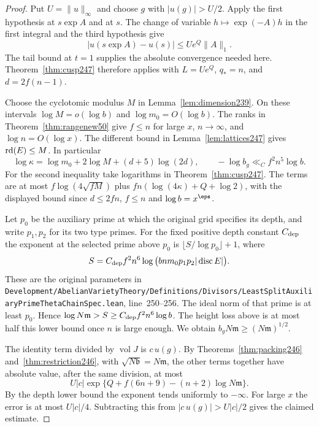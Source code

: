 \documentclass[a4paper,11pt]{article}
\theoremstyle{definition}
\theoremstyle{remark}
\newcommand{\srcloc}[2]{{\small\nolinkurl{#1.lean}}, line~#2}
\numberwithin{equation}{section}
\begin{document}
\begin{proof}
Put \(U=\|u\|_\infty\) and choose \(g\) with \(|u(g)|>U/2\).
Apply the first hypothesis at \(s\exp A\) and at \(s\). The change
of variable \(h\mapsto\exp(-A)h\) in the first integral and the third
hypothesis give
\[
                |u(s\exp A)-u(s)|\le U e^Q\|A\|_1 .
\]
The tail bound at \(t=1\) supplies the absolute convergence needed
here. Theorem~\ref{thm:cusp247} therefore applies with \(L=Ue^Q\),
\(q_*=n\), and \(d=2f(n-1)\).

Choose the cyclotomic modulus \(M\) in Lemma~\ref{lem:dimension239}.
On these intervals \(\log M=o(\log b)\) and \(\log m_0=O(\log b)\).
The ranks in Theorem~\ref{thm:rangenew50} give \(f\le n\) for large
\(x\), \(n\to\infty\), and \(\log n=O(\log x)\). The different
bound in Lemma~\ref{lem:lattices247} gives \({\rm rd}(E)\le M\).
In particular
\[
 \log\kappa=\log m_0+2\log M+(d+5)\log(2d),\qquad
               -\log b_g\ll_C f^2 n^5\log b .
\]
For the second inequality take logarithms in Theorem~\ref{thm:cusp247}.
The terms are at most \(f\log(4\sqrt{fM})\) plus
\(fn(\log(4\kappa)+Q+\log 2)\), with the displayed bound since
\(d\le2fn\), \(f\le n\) and \(\log b=x^\eps\).

Let \(p_0\) be the auxiliary prime at which the original grid
specifies its depth, and write \(p_1,p_2\) for its two type primes.
For the fixed positive depth constant \(C_{\rm dep}\) the exponent
at the selected prime above \(p_0\) is \(\lfloor S/\log p_0\rfloor+1\),
where
\[
    S=C_{\rm dep} f^2 n^6
         \log\big(b n m_0 p_1p_2 |\operatorname{disc}E|\big).
\]
These are the original parameters in
\srcloc{Development/AbelianVarietyTheory/Definitions/Divisors/LeastSplitAuxiliaryPrimeThetaChainSpec}{250--256}.
The ideal norm of that prime is at least \(p_0\). Hence
\(\log N\mathfrak m>S\ge C_{\rm dep}f^2 n^6\log b\).
The height loss above is at most half this lower bound once \(n\)
is large enough. We obtain \(b_g N\mathfrak m\ge(N\mathfrak m)^{1/2}\).

The identity term divided by \(\operatorname{vol}J\) is \(c\,u(g)\).
By Theorems~\ref{thm:packing246} and~\ref{thm:restriction246},
with \(\sqrt{N\mathfrak b}=N\mathfrak m\), the other terms together
have absolute value, after the same division, at most
\[
        U|c|\exp\{Q+f(6n+9)-(n+2)\log N\mathfrak m\} .
\]
By the depth lower bound the exponent tends uniformly to \(-\infty\).
For large \(x\) the error is at most \(U|c|/4\). Subtracting this
from \(|c\,u(g)|>U|c|/2\) gives the claimed estimate.
\end{proof}
\end{document}
